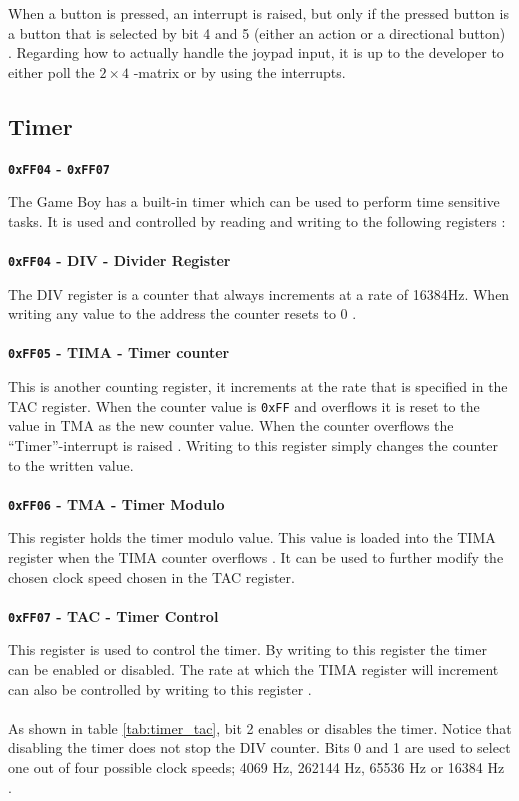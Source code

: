 When a button is pressed, an interrupt is raised, but only if the pressed button is a button that is selected by bit 4 and 5 (either an action or a directional button) \cite{pandocsjoypad}. Regarding how to actually handle the joypad input, it is up to the developer to either poll the $2 \times 4$ -matrix or by using the interrupts.

\subsection{Timer}
\label{sec:Timer}

\textbf{\texttt{0xFF04} - \texttt{0xFF07}}

The Game Boy has a built-in timer which can be used to perform time sensitive tasks. 
It is used and controlled by reading and writing to the following registers \cite{pandocstimer}:
\\\\
\textbf{\texttt{0xFF04} - DIV - Divider Register}

The DIV register is a counter that always increments at a rate of 16384Hz. 
When writing any value to the address the counter resets to 0 \cite{pandocstimer}.
\\\\
\textbf{\texttt{0xFF05} - TIMA - Timer counter}

This is another counting register, it increments at the rate that is specified in the TAC register. 
When the counter value is \texttt{0xFF} and overflows it is reset to the value in TMA as the new counter value. 
When the counter overflows the ``Timer''-interrupt is raised \cite{pandocstimer}.
Writing to this register simply changes the counter to the written value.
\\\\
\textbf{\texttt{0xFF06} - TMA - Timer Modulo}

This register holds the timer modulo value.
This value is loaded into the TIMA register when the TIMA counter overflows \cite{pandocstimer}.
It can be used to further modify the chosen clock speed chosen in the TAC register.
\\\\
\textbf{\texttt{0xFF07} - TAC - Timer Control}

This register is used to control the timer.
By writing to this register the timer can be enabled or disabled. The rate at which the TIMA register will increment can also be controlled by writing to this register \cite{pandocstimer}. 
\\\\
As shown in table \ref{tab:timer_tac}, bit 2 enables or disables the timer. 
Notice that disabling the timer does not stop the DIV counter.
Bits 0 and 1 are used to select one out of four possible clock speeds; 4069 Hz, 262144 Hz, 65536 Hz or 16384 Hz \cite{pandocstimer}. 

